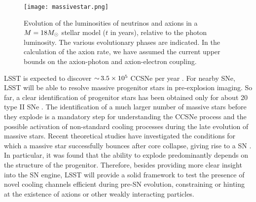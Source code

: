 \begin{figure}[t]
\centering
\texttt{[image: massivestar.png]}
\caption{Evolution of the luminosities of neutrinos and axions in a $M=18 M_\odot$ stellar model ($t$ in years), relative to the photon luminosity. The various evolutionary phases are indicated. 
In the calculation of the axion rate, we have assumed the current upper bounds on the axion-photon and axion-electron coupling.
}
\label{fig:massivestar}
\end{figure}

LSST is expected to discover $ {\sim}\, 3.5\times10^5$ CCSNe per year \citep{Lien:2009}. 
For nearby SNe, LSST will be able to resolve massive progenitor stars in pre-explosion imaging. 
So far, a clear identification of progenitor stars has been obtained only for about 20 type II SNe \citep{Smartt:2015}.  
The identification of a much larger number of massive stars before they explode is a mandatory step for understanding the CCSNe process and the possible activation of non-standard cooling processes during the late evolution of massive stars. 
Recent theoretical studies have investigated the conditions for which a massive star successfully bounces after core collapse, giving rise to a SN \citep[\eg,][and references therein]{OConnor:2011,Sukhbold:2016}.   
In particular, it was found that the ability to explode predominantly depends on the structure of the progenitor. 
Therefore, besides providing more clear insight into the SN engine, LSST will provide a solid framework to test the presence of novel cooling channels efficient during pre-SN evolution, constraining or hinting at the existence of axions or other weakly interacting particles.
